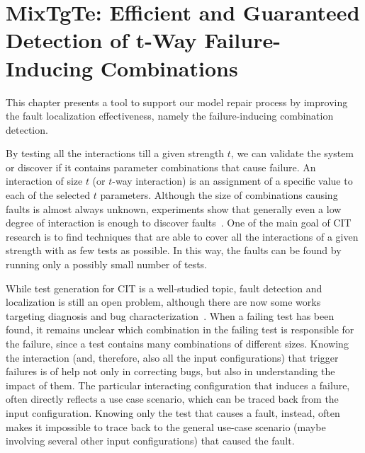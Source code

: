 \begin{tikzborder}{\cite{Gargantini16:validation}}
\begin{tikzborder}{\cite{gargantini_combinatorial_2017}}
\begin{tikzborder}{\cite{garn2019}}
\begin{tikzborder}{\cite{arcaini2019achieving}}
\chapter{MixTgTe: Efficient and Guaranteed Detection of t-Way Failure-Inducing Combinations}\label{ch:mix}


%	
This chapter presents a tool to support our model repair process by improving the fault localization effectiveness, namely the failure-inducing combination detection.

By testing all the interactions till a given strength $t$, we can validate the system or discover if it contains parameter combinations that cause failure. An interaction of size $t$ (or $t$-way interaction) is an assignment of a specific value to each of the selected $t$ parameters. Although the size of combinations causing faults is almost always unknown, experiments show that generally even a low degree of interaction is enough to discover faults~\cite{kuhncomputer09}. One of the main goal of CIT research is to find techniques that are able to cover all the interactions of a given strength with as few tests as possible. In this way, the faults can be found by running only a possibly small number of tests.

While test generation for CIT is a well-studied topic, fault detection and localization is still an open problem, although there are now some works targeting diagnosis and bug characterization~\cite{satapathy_approaches_2018}. When a failing test has been found, it remains unclear which combination in the failing test is responsible for the failure, since a test contains many combinations of different sizes. Knowing the interaction (and, therefore, also all the input configurations) that trigger failures is of help not only in correcting bugs, but also in understanding the impact of them. The particular interacting configuration that induces a failure, often directly reflects a use case scenario, which can be traced back from the input configuration. Knowing only the test that causes a fault, instead, often makes it impossible to trace back to the general use-case scenario (maybe involving several other input configurations) that caused the fault.


\end{tikzborder}
\end{tikzborder}
\end{tikzborder}
\end{tikzborder}
